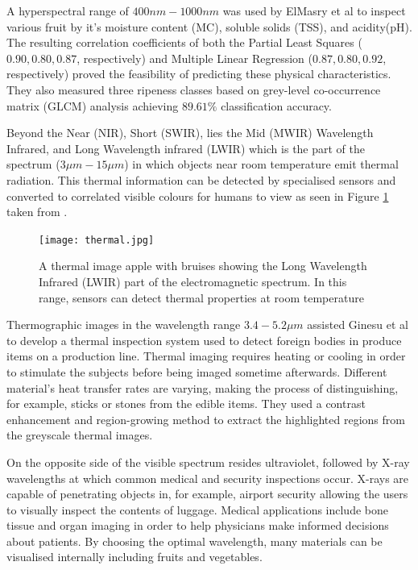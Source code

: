 \documentclass[fleqn,twoside,12pt]{report}
\begin{document}
A hyperspectral range of $400nm-1000nm$ was used by ElMasry et al \cite{elmasry2} to inspect various fruit by it's moisture content (MC), soluble solids (TSS), and acidity(pH). The resulting correlation coefficients of both the Partial Least Squares ($0.90, 0.80, 0.87$, respectively) and Multiple Linear Regression ($0.87, 0.80, 0.92$, respectively) proved the feasibility of predicting these physical characteristics. They also measured three ripeness classes based on grey-level co-occurrence matrix (GLCM) analysis achieving $89.61\%$ classification accuracy.


Beyond the Near (NIR), Short (SWIR), lies the Mid (MWIR) Wavelength Infrared, and  Long Wavelength infrared (LWIR) which is the part of the spectrum ($3\mu m-15\mu m$) in which objects near room temperature emit thermal radiation. This thermal information can be detected by specialised sensors and converted to correlated visible colours for humans to view as seen in Figure \ref{fig:thermal} taken from \cite{baranowski}.

\begin{figure}[h]
	\centering
	\texttt{[image: thermal.jpg]}
	\caption{A thermal image apple with bruises showing the Long Wavelength Infrared (LWIR) part of the electromagnetic spectrum. In this range, sensors can detect thermal properties at room temperature}
	\label{fig:thermal}
\end{figure}%


Thermographic images in the wavelength range $3.4-5.2\mu m$ assisted Ginesu et al \cite{ginesu} to develop a thermal inspection system used to detect foreign bodies in produce items on a production line. Thermal imaging requires heating or cooling in order to stimulate the subjects before being imaged sometime afterwards. Different material's heat transfer rates are varying, making the process of distinguishing, for example, sticks or stones from the edible items. They used a contrast enhancement and region-growing method to extract the highlighted regions from the greyscale thermal images.

On the opposite side of the visible spectrum resides ultraviolet, followed by X-ray wavelengths at which common medical and security inspections occur. X-rays are capable of penetrating objects in, for example, airport security allowing the users to visually inspect the contents of luggage. Medical applications include bone tissue and organ imaging in order to help physicians make informed decisions about patients. By choosing the optimal wavelength, many materials can be visualised internally including fruits and vegetables.    
\end{document}
